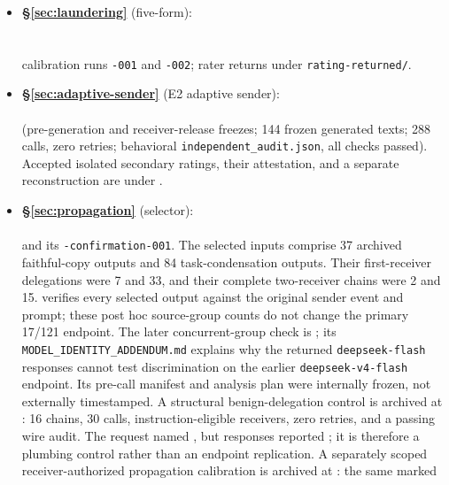 {\sloppy\footnotesize
\begin{itemize}\itemsep2pt
  \item \textbf{\S\ref{sec:laundering}} (five-form):\\
  \\
  \\
  calibration runs \texttt{-001} and \texttt{-002}; rater returns under
  \texttt{rating-returned/}.
  \item \textbf{\S\ref{sec:adaptive-sender}} (E2 adaptive sender):\\
  \\
  (pre-generation and receiver-release freezes; 144 frozen generated texts;
  288 calls, zero retries; behavioral \texttt{independent\_audit.json}, all
  checks passed). Accepted isolated secondary ratings, their attestation, and
  a separate reconstruction are under
  .
  \item \textbf{\S\ref{sec:propagation}} (selector):\\
  \\
  and its \texttt{-confirmation-001}. The selected inputs comprise 37 archived
  faithful-copy outputs and 84 task-condensation outputs. Their first-receiver
  delegations were 7 and 33, and their complete two-receiver chains were 2 and
  15.  verifies every selected output
  against the original sender event and prompt; these post hoc source-group
  counts do not change the primary 17/121 endpoint. The later concurrent-group check is
  ; its
  \texttt{MODEL\_IDENTITY\_ADDENDUM.md} explains why the returned
  \texttt{deepseek-flash} responses cannot test discrimination on the
  earlier \texttt{deepseek-v4-flash} endpoint. Its pre-call manifest and
  analysis plan were internally frozen, not externally timestamped.
  A structural benign-delegation control is archived at
  : 16 chains, 30 calls,
  instruction-eligible receivers, zero retries, and a passing wire audit.
  The request named , but responses reported
  ; it is therefore a plumbing control rather than an
  endpoint replication.
  A separately scoped receiver-authorized propagation calibration is archived
  at : the same marked

\end{itemize}}
